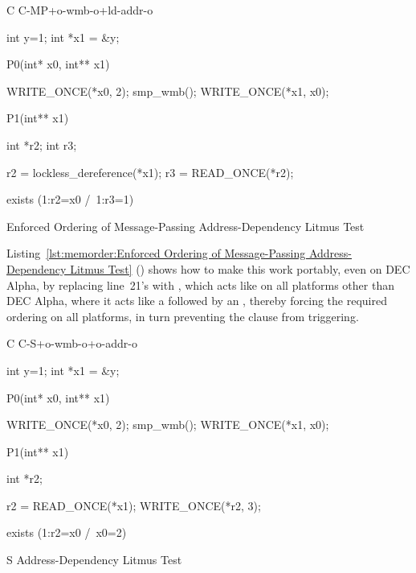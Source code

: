 \begin{listing}[tbp]
{ \scriptsize
\begin{verbbox}[\LstLineNo]
C C-MP+o-wmb-o+ld-addr-o

{
int y=1;
int *x1 = &y;
}

P0(int* x0, int** x1) {

  WRITE_ONCE(*x0, 2);
  smp_wmb();
  WRITE_ONCE(*x1, x0);

}

P1(int** x1) {

  int *r2;
  int r3;

  r2 = lockless_dereference(*x1);
  r3 = READ_ONCE(*r2);

}

exists (1:r2=x0 /\ 1:r3=1)
\end{verbbox}
}
\centering
\theverbbox
\caption{Enforced Ordering of Message-Passing Address-Dependency Litmus Test}
\label{lst:memorder:Enforced Ordering of Message-Passing Address-Dependency Litmus Test}
\end{listing}

Listing~\ref{lst:memorder:Enforced Ordering of Message-Passing Address-Dependency Litmus Test}
()
shows how to make this work portably, even on DEC Alpha, by
replacing line~21's  with ,
which acts like  on all platforms other than DEC Alpha,
where it acts like a  followed by an ,
thereby forcing the required ordering on all platforms, in turn
preventing the  clause from triggering.

\begin{listing}[tbp]
{ \scriptsize
\begin{verbbox}[\LstLineNo]
C C-S+o-wmb-o+o-addr-o

{
int y=1;
int *x1 = &y;
}

P0(int* x0, int** x1) {

  WRITE_ONCE(*x0, 2);
  smp_wmb();
  WRITE_ONCE(*x1, x0);

}

P1(int** x1) {

  int *r2;

  r2 = READ_ONCE(*x1);
  WRITE_ONCE(*r2, 3);

}

exists (1:r2=x0 /\ x0=2)
\end{verbbox}
}
\centering
\theverbbox
\caption{S Address-Dependency Litmus Test}
\label{lst:memorder:S Address-Dependency Litmus Test}
\end{listing}

